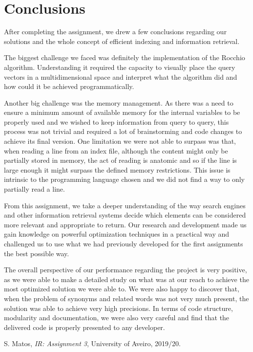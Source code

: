 \documentclass[12pt]{article}
\begin{document}
\section{Conclusions}

After completing the assignment, we drew a few conclusions regarding our
solutions and the whole concept of efficient indexing and information retrieval.

The biggest challenge we faced was definitely the implementation of the Rocchio 
algorithm.
Understanding it required the capacity to visually place the query vectors in a 
multidimensional space and interpret what the algorithm did and how could it be 
achieved programmatically.

Another big challenge was the memory management.
As there was a need to ensure a minimum amount of available memory for the internal
variables to be properly used and we wished to keep information from query to query,
this process was not trivial and required a lot of brainstorming and code changes 
to achieve its final version.
One limitation we were not able to surpass was that, when reading a line from an 
index file, although the content might only be partially stored in memory, the act
of reading is anatomic and so if the line is large enough it might surpass the 
defined memory restrictions.
This issue is intrinsic to the programming language chosen and we did not find a 
way to only partially read a line.

From this assignment, we take a deeper understanding of the way search engines 
and other information retrieval systems decide which elements can be considered
more relevant and appropriate to return.
Our research and development made us gain knowledge on powerful optimization 
techniques in a practical way and challenged us to use what we had previously
developed for the first assignments the best possible way.

The overall perspective of our performance regarding the project is very positive,
as we were able to make a detailed study on what was at our reach to achieve the 
most optimized solution we were able to.
We were also happy to discover that, when the problem of synonyms and related 
words was not very much present, the solution was able to achieve very high 
precisions.
In terms of code structure, modularity and documentation, we were also very 
careful and find that the delivered code is properly presented to any developer.

\begin{thebibliography}{9}
  

    S. Matos,
    \textit{IR: Assignment 3},
    University of Aveiro,
    2019/20.
  
\end{thebibliography}
\end{document}
